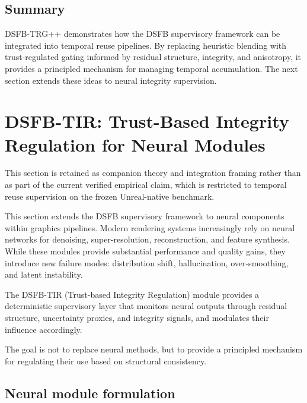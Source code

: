 \documentclass[11pt,letterpaper]{article}
\theoremstyle{gcresult}
\theoremstyle{definition}
\begin{document}

\subsection{Summary}

DSFB-TRG++ demonstrates how the DSFB supervisory framework can be integrated into temporal reuse pipelines. By replacing heuristic blending with trust-regulated gating informed by residual structure, integrity, and anisotropy, it provides a principled mechanism for managing temporal accumulation. The next section extends these ideas to neural integrity supervision.




\section{DSFB-TIR: Trust-Based Integrity Regulation for Neural Modules}

This section is retained as companion theory and integration framing rather than as part of the current verified empirical claim, which is restricted to temporal reuse supervision on the frozen Unreal-native benchmark.
\label{sec:tir}

This section extends the DSFB supervisory framework to neural components within graphics pipelines. Modern rendering systems increasingly rely on neural networks for denoising, super-resolution, reconstruction, and feature synthesis. While these modules provide substantial performance and quality gains, they introduce new failure modes: distribution shift, hallucination, over-smoothing, and latent instability.

The DSFB-TIR (Trust-based Integrity Regulation) module provides a deterministic supervisory layer that monitors neural outputs through residual structure, uncertainty proxies, and integrity signals, and modulates their influence accordingly.

The goal is not to replace neural methods, but to provide a principled mechanism for regulating their use based on structural consistency.


\subsection{Neural module formulation}
\end{document}
